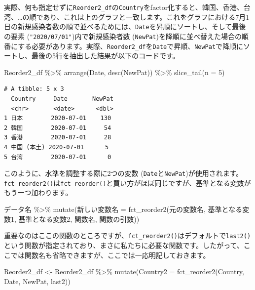 \documentclass[
  a4paper,
  pandoc,
  ja=standard,
  jafont=haranoaji]{bxjsbook}
\newenvironment{Shaded}{\begin{snugshade}}{\end{snugshade}}
\newcommand{\AttributeTok}[1]{\textcolor[rgb]{0.00,0.48,0.65}{#1}}
\newcommand{\DecValTok}[1]{\textcolor[rgb]{0.68,0.00,0.00}{#1}}
\newcommand{\FunctionTok}[1]{\textcolor[rgb]{0.28,0.35,0.67}{#1}}
\newcommand{\NormalTok}[1]{\textcolor[rgb]{0.00,0.48,0.65}{#1}}
\newcommand{\OtherTok}[1]{\textcolor[rgb]{0.00,0.48,0.65}{#1}}
\newcommand{\SpecialCharTok}[1]{\textcolor[rgb]{0.37,0.37,0.37}{#1}}
\begin{document}
実際、何も指定せずに\texttt{Reorder2\_df}の\texttt{Country}をfactor化すると、韓国、香港、台湾、\ldots の順であり、これは上のグラフと一致します。これをグラフにおける7月1日の新規感染者数の順で並べるためには、\texttt{Date}を昇順にソートし、そして最後の要素
(\texttt{"2020/07/01"})内で新規感染者数
(\texttt{NewPat})を降順に並べ替えた場合の順番にする必要があります。実際、\texttt{Reorder2\_df}を\texttt{Date}で昇順、\texttt{NewPat}で降順にソートし、最後の5行を抽出した結果が以下のコードです。

\begin{Shaded}
\begin{Highlighting}[numbers=left,,]
\NormalTok{Reorder2\_df }\SpecialCharTok{\%\textgreater{}\%}
  \FunctionTok{arrange}\NormalTok{(Date, }\FunctionTok{desc}\NormalTok{(NewPat)) }\SpecialCharTok{\%\textgreater{}\%}
  \FunctionTok{slice\_tail}\NormalTok{(}\AttributeTok{n =} \DecValTok{5}\NormalTok{)}
\end{Highlighting}
\end{Shaded}

\begin{verbatim}
# A tibble: 5 x 3
  Country     Date       NewPat
  <chr>       <date>      <dbl>
1 日本        2020-07-01    130
2 韓国        2020-07-01     54
3 香港        2020-07-01     28
4 中国 (本土) 2020-07-01      5
5 台湾        2020-07-01      0
\end{verbatim}

このように、水準を調整する際に2つの変数
(\texttt{Date}と\texttt{NewPat})が使用されます。\texttt{fct\_reorder2()}は\texttt{fct\_reorder()}と買い方がほぼ同じですが、基準となる変数がもう一つ加わります。

\begin{Shaded}
\begin{Highlighting}[numbers=left,,]
\NormalTok{データ名 }\SpecialCharTok{\%\textgreater{}\%}
  \FunctionTok{mutate}\NormalTok{(新しい変数名 }\OtherTok{=} \FunctionTok{fct\_reorder2}\NormalTok{(元の変数名, }
\NormalTok{                                    基準となる変数1, 基準となる変数2,}
\NormalTok{                                    関数名, 関数の引数))}
\end{Highlighting}
\end{Shaded}

重要なのはここの関数のところですが、\texttt{fct\_reorder2()}はデフォルトで\texttt{last2()}という関数が指定されており、まさに私たちに必要な関数です。したがって、ここでは関数名も省略できますが、ここでは一応明記しておきます。

\begin{Shaded}
\begin{Highlighting}[numbers=left,,]
\NormalTok{Reorder2\_df }\OtherTok{\textless{}{-}}\NormalTok{ Reorder2\_df }\SpecialCharTok{\%\textgreater{}\%}
  \FunctionTok{mutate}\NormalTok{(}\AttributeTok{Country2 =} \FunctionTok{fct\_reorder2}\NormalTok{(Country, Date, NewPat, last2)) }
\end{Highlighting}
\end{Shaded}
\end{document}
